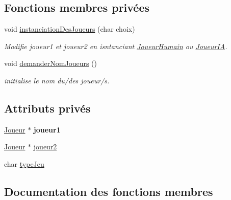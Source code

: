 \subsection*{Fonctions membres privées}
\begin{DoxyCompactItemize}
\item 
void \hyperlink{class_jeu_bataille_navale_a96f8b9a6d42db7e505e0046ad78b71cc}{instanciation\+Des\+Joueurs} (char choix)
\begin{DoxyCompactList}\small\item\em Modifie joueur1 et joueur2 en isntanciant \hyperlink{class_joueur_humain}{Joueur\+Humain} ou \hyperlink{class_joueur_i_a}{Joueur\+IA}. \end{DoxyCompactList}\item 
void \hyperlink{class_jeu_bataille_navale_a00065487788bcf1a3b5689138a688b13}{demander\+Nom\+Joueurs} ()\hypertarget{class_jeu_bataille_navale_a00065487788bcf1a3b5689138a688b13}{}\label{class_jeu_bataille_navale_a00065487788bcf1a3b5689138a688b13}

\begin{DoxyCompactList}\small\item\em initialise le nom du/des joueur/s. \end{DoxyCompactList}\end{DoxyCompactItemize}
\subsection*{Attributs privés}
\begin{DoxyCompactItemize}
\item 
\hyperlink{class_joueur}{Joueur} $\ast$ {\bfseries joueur1}\hypertarget{class_jeu_bataille_navale_a74843e77b779a96f41de250f075abfe0}{}\label{class_jeu_bataille_navale_a74843e77b779a96f41de250f075abfe0}

\item 
\hyperlink{class_joueur}{Joueur} $\ast$ \hyperlink{class_jeu_bataille_navale_a8f8d8306d7101c44006a7a27a74ab640}{joueur2}
\item 
char \hyperlink{class_jeu_bataille_navale_abac1f29d41caf119a9766f323506dbe0}{type\+Jeu}
\end{DoxyCompactItemize}


\subsection{Documentation des fonctions membres}
